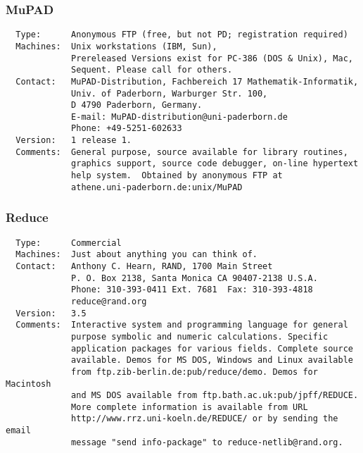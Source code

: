 \documentclass[twoside,11pt]{article}
\begin{document}
\subsubsection{MuPAD}
\begin{verbatim}
  Type:      Anonymous FTP (free, but not PD; registration required)
  Machines:  Unix workstations (IBM, Sun),
             Prereleased Versions exist for PC-386 (DOS & Unix), Mac,
             Sequent. Please call for others.
  Contact:   MuPAD-Distribution, Fachbereich 17 Mathematik-Informatik,
             Univ. of Paderborn, Warburger Str. 100,
             D 4790 Paderborn, Germany.
             E-mail: MuPAD-distribution@uni-paderborn.de
             Phone: +49-5251-602633
  Version:   1 release 1.
  Comments:  General purpose, source available for library routines,
             graphics support, source code debugger, on-line hypertext
             help system.  Obtained by anonymous FTP at
             athene.uni-paderborn.de:unix/MuPAD
\end{verbatim}

\subsubsection{Reduce}
\begin{verbatim}
  Type:      Commercial
  Machines:  Just about anything you can think of.
  Contact:   Anthony C. Hearn, RAND, 1700 Main Street
             P. O. Box 2138, Santa Monica CA 90407-2138 U.S.A.
             Phone: 310-393-0411 Ext. 7681  Fax: 310-393-4818
             reduce@rand.org
  Version:   3.5
  Comments:  Interactive system and programming language for general
             purpose symbolic and numeric calculations. Specific
             application packages for various fields. Complete source
             available. Demos for MS DOS, Windows and Linux available
             from ftp.zib-berlin.de:pub/reduce/demo. Demos for Macintosh
             and MS DOS available from ftp.bath.ac.uk:pub/jpff/REDUCE.
             More complete information is available from URL
             http://www.rrz.uni-koeln.de/REDUCE/ or by sending the email
             message "send info-package" to reduce-netlib@rand.org.
\end{verbatim}
\end{document}

